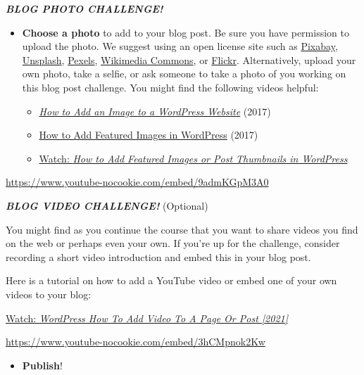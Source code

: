 \documentclass[
  letterpaper,
  DIV=11,
  numbers=noendperiod]{scrreprt}
\providecommand{\tightlist}{%
  \setlength{\itemsep}{0pt}\setlength{\parskip}{0pt}}\usepackage{longtable,booktabs,array}
\begin{document}
\begin{tcolorbox}
\textbf{\emph{BLOG PHOTO CHALLENGE!}}

\begin{itemize}
\tightlist
\item
  \textbf{Choose a photo} to add to your blog post. Be sure you have
  permission to upload the photo. We suggest using an open license site
  such as \href{https://pixabay.com/}{Pixabay},
  \href{https://unsplash.com/}{Unsplash},
  \href{https://www.pexels.com/}{Pexels},
  \href{https://commons.wikimedia.org/wiki/Main_Page}{Wikimedia
  Commons}, or
  \href{https://www.flickr.com/search/?text=pho&license=2\%2C3\%2C4\%2C5\%2C6\%2C9}{Flickr}.
  Alternatively, upload your own photo, take a selfie, or ask someone to
  take a photo of you working on this blog post challenge. You might
  find the following videos helpful:

  \begin{itemize}
  \tightlist
  \item
    \href{https://www.youtube.com/watch?v=W89wPcVU60c}{\emph{How to Add
    an Image to a WordPress Website}} (2017)
  \item
    \href{https://www.youtube.com/watch?v=9admKGpM3A0}{How to Add
    Featured Images in WordPress} (2017)
  \item
    \href{https://www.youtube.com/watch?v=9admKGpM3A0}{Watch: \emph{How
    to Add Featured Images or Post Thumbnails in WordPress}}
  \end{itemize}
\end{itemize}

\url{https://www.youtube-nocookie.com/embed/9admKGpM3A0}

\textbf{\emph{BLOG VIDEO CHALLENGE!}} (Optional)

You might find as you continue the course that you want to share videos
you find on the web or perhaps even your own. If you're up for the
challenge, consider recording a short video introduction and embed this
in your blog post.

Here is a tutorial on how to add a YouTube video or embed one of your
own videos to your blog:

\href{https://www.youtube.com/watch?v=3hCMpnok2Kw}{Watch:
\emph{WordPress How To Add Video To A Page Or Post {[}2021{]}}}

\url{https://www.youtube-nocookie.com/embed/3hCMpnok2Kw}

\begin{itemize}
\tightlist
\item
  \textbf{Publish}!


\end{itemize}
\end{tcolorbox}
\end{document}
